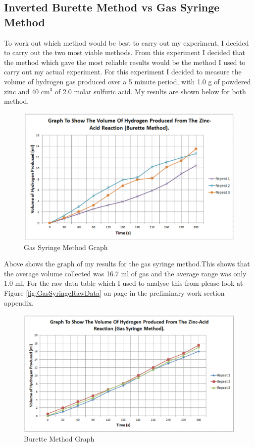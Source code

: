 	\subsection{Inverted Burette Method vs Gas Syringe Method} 

To work out which method would be best to carry out my experiment, I decided to carry out the two most viable methods. From this experiment I decided that the method which gave the most reliable results would be the method I used to carry out my actual experiment. For this experiment I decided to measure the volume of hydrogen gas produced over a 5 minute period, with 1.0 g of powdered zinc and 40 cm$^3$ of 2.0 molar sulfuric acid. My results are shown below for both method.

\begin{figure}[H]
    \includegraphics[width=\textwidth]{./preliminarywork/Graphs/GasSyringe.pdf}
    \caption{Gas Syringe Method Graph} \label{fig:Gas Syringe Method Results}
\end{figure}

Above shows the graph of my results for the gas syringe method.This shows that the average volume collected was 16.7 ml of gas and the average range was only 1.0 ml. For the raw data table which I used to analyse this from please look at Figure \ref{fig:GasSyringeRawData} on page \pageref{fig:GasSyringeRawData} in the preliminary work section appendix.




\begin{figure}[H]
    \includegraphics[width=\textwidth]{./preliminarywork/Graphs/Burette.pdf}
    \caption{Burette Method Graph} \label{fig:Burette Method Results}
\end{figure}

